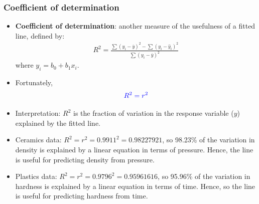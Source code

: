 \documentclass[handout]{beamer}
\providecommand{\ov}[1]{\overline{#1}}
\providecommand{\wh}[1]{\widehat{#1}}
\numberwithin{equation}{section}
\begin{document}
\begin{frame}
\frametitle{Coefficient of determination} \scriptsize
\begin{itemize}
\pause \item {\bf Coefficient of determination}: another measure of the usefulness of a fitted line, defined by:
\pause \begin{align*}
R^2 = \frac{\sum(y_i - \ov{y})^2 - \sum(y_i - \wh{y}_i)^2}{\sum(y_i - \ov{y})^2}
\end{align*}
\pause where $y_i = b_0 + b_1 x_i$.
\pause \item Fortunately,
\begin{align*} \color{blue}
R^2 = r^2
\end{align*}
\pause \item Interpretation: $R^2$ is the fraction of variation in the response variable ($y$) explained by the fitted line.
\pause \item Ceramics data: $R^2 = r^2 = 0.9911^2 = 0.98227921$, so  98.23\% of the variation in density is explained by a linear equation in terms of pressure. Hence, the line is useful for predicting density from pressure.
\pause \item Plastics data: $R^2 = r^2 = 0.9796^2 = 0.95961616$, so  95.96\% of the variation in hardness is explained by a linear equation in terms of time. Hence, so the line is useful for predicting hardness from time.

\end{itemize}
\end{frame}
\end{document}
